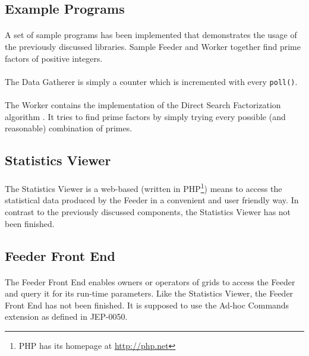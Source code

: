 \subsection{Example Programs}
\label{sec:samples}
\paragraph{}
A set of sample programs has been implemented that demonstrates the usage of the previously discussed libraries. Sample Feeder and Worker together find prime factors of positive integers.

\paragraph{}
The Data Gatherer is simply a counter which is incremented with every \texttt{poll()}.

\paragraph{}
The Worker contains the implementation of the Direct Search Factorization algorithm \cite{mathworld001,wikipedia007}. It tries to find prime factors by simply trying every possible (and reasonable) combination of primes.


\subsection{Statistics Viewer}
\paragraph{}
The Statistics Viewer is a web-based (written in PHP\footnote{PHP has its homepage at \href{http://php.net}{http://php.net}}) means to access the statistical data produced by the Feeder in a convenient and user friendly way. In contrast to the previously discussed components, the Statistics Viewer has not been finished.


\subsection{Feeder Front End}
\paragraph{}
The Feeder Front End enables owners or operators of grids to access the Feeder and query it for its run-time parameters. Like the Statistics Viewer, the Feeder Front End has not been finished. It is supposed to use the Ad-hoc Commands extension as defined in JEP-0050.

